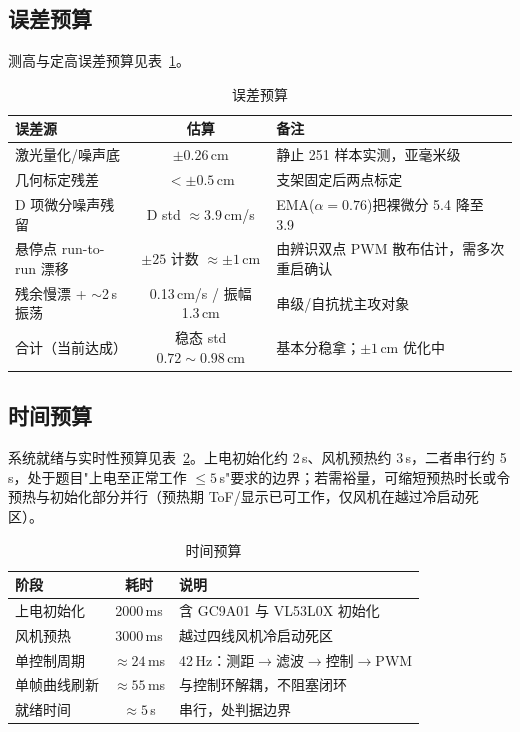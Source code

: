\documentclass[12pt,a4paper]{ctexart}
\begin{document}
\subsection{误差预算}

测高与定高误差预算见表~\ref{tab:err}。

\begin{table}[H]
\centering
\caption{误差预算}
\label{tab:err}
\begin{tabular}{l c p{5.2cm}}
\toprule
误差源 & 估算 & 备注 \\
\midrule
激光量化/噪声底 & $\pm0.26$\,cm & 静止 251 样本实测，亚毫米级 \\
几何标定残差 & $<\pm0.5$\,cm & 支架固定后两点标定 \\
D 项微分噪声残留 & D std $\approx3.9$\,cm/s & EMA($\alpha{=}0.76$)把裸微分 5.4 降至 3.9 \\
悬停点 run-to-run 漂移 & $\pm25$ 计数 $\approx\pm1$\,cm & 由辨识双点 PWM 散布估计，需多次重启确认 \\
残余慢漂 + $\sim$2\,s 振荡 & 0.13\,cm/s / 振幅 1.3\,cm & 串级/自抗扰主攻对象 \\
\midrule
合计（当前达成） & 稳态 std $0.72\sim0.98$\,cm & 基本分稳拿；$\pm1$\,cm 优化中 \\
\bottomrule
\end{tabular}
\end{table}

\subsection{时间预算}

系统就绪与实时性预算见表~\ref{tab:time}。上电初始化约 2\,s、风机预热约 3\,s，二者串行约 5\,s，处于题目"上电至正常工作 $\le5$\,s"要求的边界；若需裕量，可缩短预热时长或令预热与初始化部分并行（预热期 ToF/显示已可工作，仅风机在越过冷启动死区）。

\begin{table}[H]
\centering
\caption{时间预算}
\label{tab:time}
\begin{tabular}{lcl}
\toprule
阶段 & 耗时 & 说明 \\
\midrule
上电初始化 & 2000\,ms & 含 GC9A01 与 VL53L0X 初始化 \\
风机预热 & 3000\,ms & 越过四线风机冷启动死区 \\
单控制周期 & $\approx24$\,ms & 42\,Hz：测距$\rightarrow$滤波$\rightarrow$控制$\rightarrow$PWM \\
单帧曲线刷新 & $\approx55$\,ms & 与控制环解耦，不阻塞闭环 \\
\midrule
就绪时间 & $\approx5$\,s & 串行，处判据边界 \\
\bottomrule
\end{tabular}
\end{table}
\end{document}
